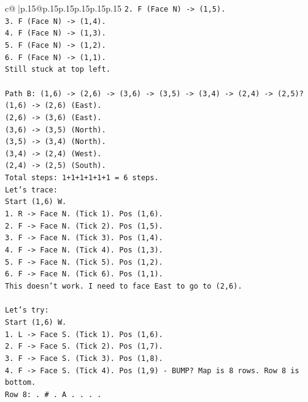 \documentclass{article}
\begin{document}
{\begin{supertabular}{c@{$\;$}|p{.15\linewidth}@{}p{.15\linewidth}p{.15\linewidth}p{.15\linewidth}p{.15\linewidth}p{.15\linewidth}}
{{{\texttt{2. F (Face N) {-}> (1,5).} \\
\texttt{3. F (Face N) {-}> (1,4).} \\
\texttt{4. F (Face N) {-}> (1,3).} \\
\texttt{5. F (Face N) {-}> (1,2).} \\
\texttt{6. F (Face N) {-}> (1,1).} \\
\texttt{Still stuck at top left.} \\
\\ 
\texttt{Path B: (1,6) {-}> (2,6) {-}> (3,6) {-}> (3,5) {-}> (3,4) {-}> (2,4) {-}> (2,5)?} \\
\texttt{(1,6) {-}> (2,6) (East).} \\
\texttt{(2,6) {-}> (3,6) (East).} \\
\texttt{(3,6) {-}> (3,5) (North).} \\
\texttt{(3,5) {-}> (3,4) (North).} \\
\texttt{(3,4) {-}> (2,4) (West).} \\
\texttt{(2,4) {-}> (2,5) (South).} \\
\texttt{Total steps: 1+1+1+1+1+1 = 6 steps.} \\
\texttt{Let's trace:} \\
\texttt{Start (1,6) W.} \\
\texttt{1. R {-}> Face N. (Tick 1). Pos (1,6).} \\
\texttt{2. F {-}> Face N. (Tick 2). Pos (1,5).} \\
\texttt{3. F {-}> Face N. (Tick 3). Pos (1,4).} \\
\texttt{4. F {-}> Face N. (Tick 4). Pos (1,3).} \\
\texttt{5. F {-}> Face N. (Tick 5). Pos (1,2).} \\
\texttt{6. F {-}> Face N. (Tick 6). Pos (1,1).} \\
\texttt{This doesn't work. I need to face East to go to (2,6).} \\
\\ 
\texttt{Let's try:} \\
\texttt{Start (1,6) W.} \\
\texttt{1. L {-}> Face S. (Tick 1). Pos (1,6).} \\
\texttt{2. F {-}> Face S. (Tick 2). Pos (1,7).} \\
\texttt{3. F {-}> Face S. (Tick 3). Pos (1,8).} \\
\texttt{4. F {-}> Face S. (Tick 4). Pos (1,9) {-} BUMP? Map is 8 rows. Row 8 is bottom.} \\
\texttt{Row 8: . \# . A . . . .} \\
}}}
\end{supertabular}}
\end{document}
